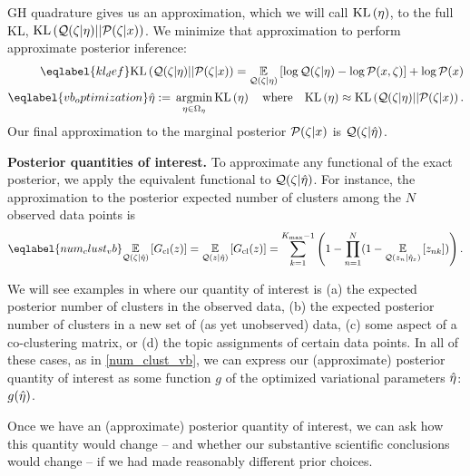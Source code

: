 GH quadrature gives us an approximation, which we will call $\mathrm{KL}\left(\eta\right)$, to the
full KL, $\mathrm{KL}\left(\mathcal{Q}(\zeta \vert \eta) || \mathcal{P}(\zeta \vert x)\right)$. We minimize that
approximation to perform approximate posterior inference:
%
\begin{align}
%
\eqlabel{kl_def}
\KL{\q(\zeta \vert \eta) || \p(\zeta \vert \x)}
={}    \expect{\q(\zeta \vert \eta)}{
        \log \q(\zeta \vert \eta) - \log\p(\x, \zeta)} + \log\p(\x) \\
%
\eqlabel{vb_optimization}
\etaopt :={} \argmin_{\eta \in \etadom} \KL{\eta} \mathwhere
\KL{\eta} \approx{} \KL{\q(\zeta \vert \eta) || \p(\zeta \vert \x)}.
%
\end{align}
%
Our final approximation to the marginal posterior $\mathcal{P}(\zeta \vert x)$ is
$\mathcal{Q}(\zeta \vert \hat\eta)$.

\noindent \textbf{Posterior quantities of interest.} To approximate any
functional of the exact posterior, we apply the equivalent functional to
$\mathcal{Q}(\zeta \vert \hat\eta)$. For instance, the approximation to the posterior
expected number of clusters among the $N$ observed data points is
%
\begin{align} \eqlabel{num_clust_vb}
%
\expect{\q(\zeta \vert\etaopt)}{\nclusters(\z)} =
\expect{\q(\z\vert\etaopt)}{\nclusters(\z)} =
\sumkm \left(1 -  \prod_{\n=1}^\N
    (1 - \expect{\q(\z_\n \vert \etaoptz)}{\z_{\n\k}})\right).
%
\end{align}
%

We will see examples in  where our quantity of interest is (a)
the expected posterior number of clusters in the observed data, (b) the expected
posterior number of clusters in a new set of (as yet unobserved) data, (c) some
aspect of a co-clustering matrix, or (d) the topic assignments of certain data
points. In all of these cases, as in \eqref{num_clust_vb}, we can express our
(approximate) posterior quantity of interest as some function $g$ of the
optimized variational parameters $\hat\eta$: $g(\hat\eta)$.

Once we have an (approximate) posterior quantity of interest, we can ask how
this quantity would change -- and whether our substantive scientific conclusions
would change -- if we had made reasonably different prior choices.
